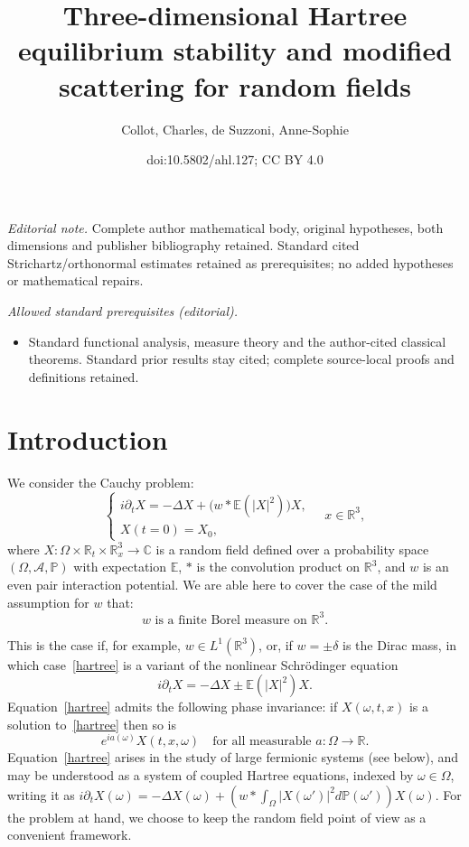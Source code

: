 \documentclass[10pt]{amsart}
\title{Three-dimensional Hartree equilibrium stability and modified scattering for random fields}
\author{Collot, Charles, de Suzzoni, Anne-Sophie}
\date{doi:10.5802/ahl.127; CC BY 4.0}
\theoremstyle{definition}\newtheorem{defi}[theo]{Definition}\newtheorem{rema}[theo]{Remark}\newtheorem{exam}[theo]{Example}\newtheorem{exem}[theo]{Example}\newtheorem{nota}[theo]{Notation}
\newcommand{\R}{\mathbb{R}}
\newcommand{\C}{\mathbb{C}}
\newcommand{\E}{\mathbb{E}}
\newcommand{\bbP}{\mathbb{P}}
\newcommand{\mclA}{\mathcal{A}}
\newcommand{\pa}{\partial}
\begin{document}
\maketitle
\noindent\textit{Editorial note.} Complete author mathematical body, original hypotheses, both dimensions and publisher bibliography retained. Standard cited Strichartz/orthonormal estimates retained as prerequisites; no added hypotheses or mathematical repairs.\par\medskip
\noindent\textit{Allowed standard prerequisites (editorial).}\begin{itemize}
\item Standard functional analysis, measure theory and the author-cited classical theorems. Standard prior results stay cited; complete source-local proofs and definitions retained.
\end{itemize}\medskip
\tableofcontents



\section{Introduction}


We consider the Cauchy problem:
\begin{equation} \label{hartree}
\begin{cases}
i\partial_t X = -\Delta X + \big(w*\E\left(|X|^2\right)\big) X, \\
X(t=0) = X_0,
\end{cases} \quad x\in \R^3,
\end{equation}
where $X : \Omega \times \R_t \times \R^3_x\rightarrow \C$ is a random field defined over a probability space $(\Omega,\mclA, \bbP)$ with expectation $\E$, $*$ is the convolution product on $\R^3$, and $w$ is an even pair interaction potential. We are able here to cover the case of the mild assumption for $w$ that:
\begin{equation} \label{id:hpw}
w \text{ is a finite Borel measure on } \R^3.
\end{equation} 

This is the case if, for example, $w\in L^1(\R^3)$, or, if $w=\pm \delta$ is the Dirac mass, in which case~\eqref{hartree} is a variant of the nonlinear Schr\"odinger equation
\[
i\partial_t X = -\Delta X \pm \E\left(|X|^2\right) X.
\]
Equation~\eqref{hartree} admits the following phase invariance: if $X(\omega,t,x)$ is a solution to~\eqref{hartree} then so is
\begin{equation} \label{id:phase}
e^{ia(\omega)}X(t,x,\omega) \quad \text{for all measurable } a:\Omega \rightarrow \R.
\end{equation}
Equation~\eqref{hartree} arises in the study of large fermionic systems (see below), and may be understood as a system of coupled Hartree equations, indexed by $\omega \in \Omega$, writing it as $i\pa_t X(\omega)=-\Delta X(\omega)+(w*\int_{\Omega}|X(\omega')|^2d\bbP (\omega'))X(\omega)$. For the problem at hand, we choose to keep the random field point of view as a convenient framework.
\end{document}
